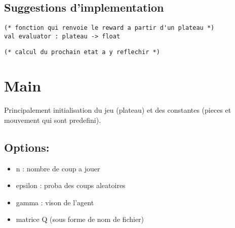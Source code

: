 \documentclass{article}
\begin{document}
\subsection{Suggestions d'implementation}

\begin{lstlisting}[frame=L]
(* fonction qui renvoie le reward a partir d'un plateau *)
val evaluator : plateau -> float
\end{lstlisting}

\begin{lstlisting}
(* calcul du prochain etat a y reflechir *)
\end{lstlisting}

\section{Main}

Principalement initialisation du jeu (plateau) et des constantes (pieces et
mouvement qui sont predefini).


\subsection{Options:}
\begin{itemize}
	\item n : nombre de coup a jouer
	\item epsilon : proba des coups aleatoires
	\item gamma : vison de l'agent
	\item matrice Q (sous forme de nom de fichier)
\end{itemize}
\end{document}

